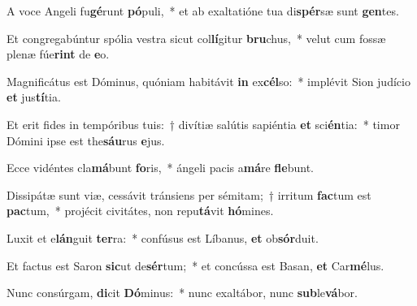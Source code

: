 \item A voce Angeli fu\textbf{gé}runt \textbf{pó}puli,~* et ab exaltatióne tua di\textbf{spér}sæ sunt \textbf{gen}tes.
\item Et congregabúntur spólia vestra sicut col\textbf{lí}gitur \textbf{bru}chus,~* velut cum fossæ plenæ fúe\textbf{rint} de \textbf{e}o.
\item Magnificátus est Dóminus, quóniam habitávit \textbf{in} ex\textbf{cél}so:~* implévit Sion judício \textbf{et} jus\textbf{tí}tia.
\item Et erit fides in tempóribus tuis:~† divítiæ salútis sapiéntia \textbf{et} sci\textbf{én}tia:~* timor Dómini ipse est the\textbf{sáu}rus \textbf{e}jus.
\item Ecce vidéntes cla\textbf{má}bunt \textbf{fo}ris,~* ángeli pacis a\textbf{má}re \textbf{fle}bunt.
\item Dissipátæ sunt viæ, cessávit tránsiens per sémitam;~† irritum \textbf{fac}tum est \textbf{pac}tum,~* projécit civitátes, non repu\textbf{tá}vit \textbf{hó}mines.
\item Luxit et e\textbf{lán}guit \textbf{ter}ra:~* confúsus est Líbanus, \textbf{et} ob\textbf{sór}duit.
\item Et factus est Saron \textbf{sic}ut de\textbf{sér}tum;~* et concússa est Basan, \textbf{et} Car\textbf{mé}lus.
\item Nunc consúrgam, \textbf{di}cit \textbf{Dó}minus:~* nunc exaltábor, nunc \textbf{sub}le\textbf{vá}bor.
